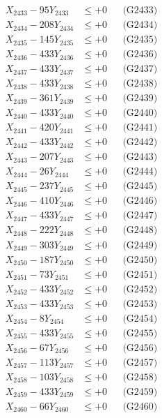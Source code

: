 \documentclass[a4paper,10pt]{article}
\begin{document}
{\begin{align}
X_{2433} - 95Y_{2433} &\leq +0 && \text{(G2433)} \\
X_{2434} - 208Y_{2434} &\leq +0 && \text{(G2434)} \\
X_{2435} - 145Y_{2435} &\leq +0 && \text{(G2435)} \\
X_{2436} - 433Y_{2436} &\leq +0 && \text{(G2436)} \\
X_{2437} - 433Y_{2437} &\leq +0 && \text{(G2437)} \\
X_{2438} - 433Y_{2438} &\leq +0 && \text{(G2438)} \\
X_{2439} - 361Y_{2439} &\leq +0 && \text{(G2439)} \\
X_{2440} - 433Y_{2440} &\leq +0 && \text{(G2440)} \\
\allowbreak
X_{2441} - 420Y_{2441} &\leq +0 && \text{(G2441)} \\
X_{2442} - 433Y_{2442} &\leq +0 && \text{(G2442)} \\
X_{2443} - 207Y_{2443} &\leq +0 && \text{(G2443)} \\
X_{2444} - 26Y_{2444} &\leq +0 && \text{(G2444)} \\
X_{2445} - 237Y_{2445} &\leq +0 && \text{(G2445)} \\
X_{2446} - 410Y_{2446} &\leq +0 && \text{(G2446)} \\
X_{2447} - 433Y_{2447} &\leq +0 && \text{(G2447)} \\
X_{2448} - 222Y_{2448} &\leq +0 && \text{(G2448)} \\
X_{2449} - 303Y_{2449} &\leq +0 && \text{(G2449)} \\
X_{2450} - 187Y_{2450} &\leq +0 && \text{(G2450)} \\
\allowbreak
X_{2451} - 73Y_{2451} &\leq +0 && \text{(G2451)} \\
X_{2452} - 433Y_{2452} &\leq +0 && \text{(G2452)} \\
X_{2453} - 433Y_{2453} &\leq +0 && \text{(G2453)} \\
X_{2454} - 8Y_{2454} &\leq +0 && \text{(G2454)} \\
X_{2455} - 433Y_{2455} &\leq +0 && \text{(G2455)} \\
X_{2456} - 67Y_{2456} &\leq +0 && \text{(G2456)} \\
X_{2457} - 113Y_{2457} &\leq +0 && \text{(G2457)} \\
X_{2458} - 103Y_{2458} &\leq +0 && \text{(G2458)} \\
X_{2459} - 433Y_{2459} &\leq +0 && \text{(G2459)} \\
X_{2460} - 66Y_{2460} &\leq +0 && \text{(G2460)} \\

\end{align}}
\end{document}
